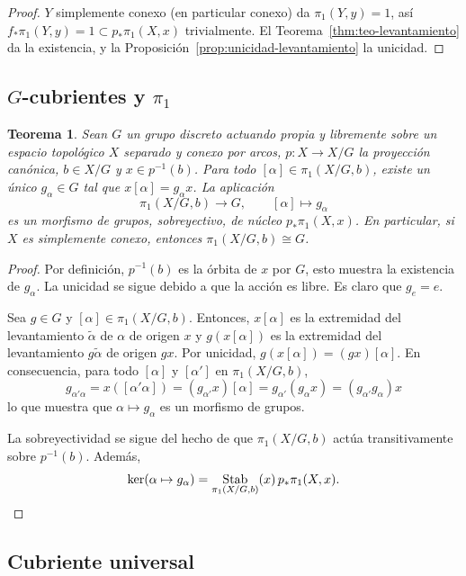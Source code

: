 \documentclass[11pt,a4paper]{article}
\theoremstyle{plain}
\newtheorem{theorem}{Teorema}[section]
\theoremstyle{definition}
\theoremstyle{remark}
\DeclareMathOperator{\Stab}{Stab}
\begin{document}
\begin{proof}
$Y$ simplemente conexo (en particular conexo) da $\pi_1(Y,y)=1$, así
$f_*\pi_1(Y,y)=1\subset p_*\pi_1(X,x)$ trivialmente. El
Teorema~\ref{thm:teo-levantamiento} da la existencia, y la
Proposición~\ref{prop:unicidad-levantamiento} la unicidad.
\end{proof}

\subsection{$G$-cubrientes y $\pi_1$}

\begin{theorem}
\label{thm:pi1-G-cubriente}
Sean $G$ un grupo discreto actuando propia y libremente sobre un espacio
topológico $X$ separado y conexo por arcos, $p:X\to X/G$ la proyección
canónica, $b\in X/G$ y $x\in p^{-1}(b)$. Para todo $[\alpha]\in\pi_1(X/G,b)$,
existe un único $g_\alpha\in G$ tal que $x[\alpha]=g_\alpha x$. La aplicación
\[
\pi_1(X/G,b)\to G, \qquad [\alpha]\mapsto g_\alpha
\]
es un morfismo de grupos, sobreyectivo, de núcleo $p_*\pi_1(X,x)$. En
particular, si $X$ es simplemente conexo, entonces $\pi_1(X/G,b)\cong G$.
\end{theorem}

\begin{proof}
Por definición, $p^{-1}(b)$ es la órbita de $x$ por $G$, esto muestra la
existencia de $g_\alpha$. La unicidad se sigue debido a que la acción es
libre. Es claro que $g_e=e$.

Sea $g\in G$ y $[\alpha]\in\pi_1(X/G,b)$. Entonces, $x[\alpha]$ es la
extremidad del levantamiento $\tilde\alpha$ de $\alpha$ de origen $x$ y
$g(x[\alpha])$ es la extremidad del levantamiento $g\tilde\alpha$ de origen
$gx$. Por unicidad, $g(x[\alpha])=(gx)[\alpha]$. En consecuencia, para todo
$[\alpha]$ y $[\alpha']$ en $\pi_1(X/G,b)$,
\[
g_{\alpha'\alpha}=x([\alpha'\alpha])=(g_{\alpha'}x)[\alpha]=g_{\alpha'}(g_\alpha x)=(g_{\alpha'}g_\alpha)x
\]
lo que muestra que $\alpha\mapsto g_\alpha$ es un morfismo de grupos.

La sobreyectividad se sigue del hecho de que $\pi_1(X/G,b)$ actúa
transitivamente sobre $p^{-1}(b)$. Además,
\[
\ker(\alpha\mapsto g_\alpha)=\Stab_{\pi_1(X/G,b)}(x)\,p_*\pi_1(X,x).\qedhere
\]
\end{proof}

\subsection{Cubriente universal}
\end{document}
